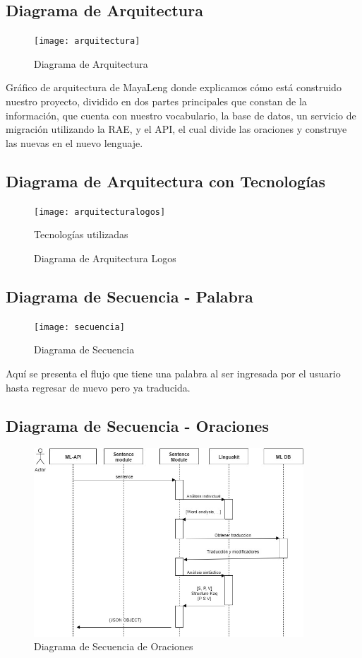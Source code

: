 \documentclass[a4paper,openright,11pt]{article}
\begin{document}
\subsection{Diagrama de Arquitectura}
\begin{figure}[h]
	\centering
	\texttt{[image: arquitectura]}
	\caption{Diagrama de Arquitectura}
	\label{fig:arq}
\end{figure}
Gráfico de arquitectura de MayaLeng donde explicamos cómo está construido nuestro proyecto, dividido en dos partes principales que constan de la información, que cuenta con nuestro vocabulario, la base de datos, un servicio de migración utilizando la RAE, y el API, el cual divide las oraciones y construye las nuevas en el nuevo lenguaje.

\subsection{Diagrama de Arquitectura con Tecnologías}
\begin{figure}[H]
	\centering
	\texttt{[image: arquitecturalogos]}
	\caption{Diagrama de Arquitectura Logos} 
	Tecnologías utilizadas
	\label{fig:arqL}
\end{figure}

\subsection{Diagrama de Secuencia - Palabra}
\begin{figure}[h]
	\centering
	\texttt{[image: secuencia]}
	\caption{Diagrama de Secuencia}
	\label{fig:sec}
\end{figure}
Aquí se presenta el flujo que tiene una palabra al ser ingresada por el usuario hasta regresar de nuevo pero ya traducida.

\subsection{Diagrama de Secuencia - Oraciones}
\begin{figure}[H]
	\centering
	\includegraphics[width=0.9\textwidth]{secuenciaoracion}
	\caption{Diagrama de Secuencia de Oraciones}
	\label{fig:seco}
\end{figure}
\end{document}
